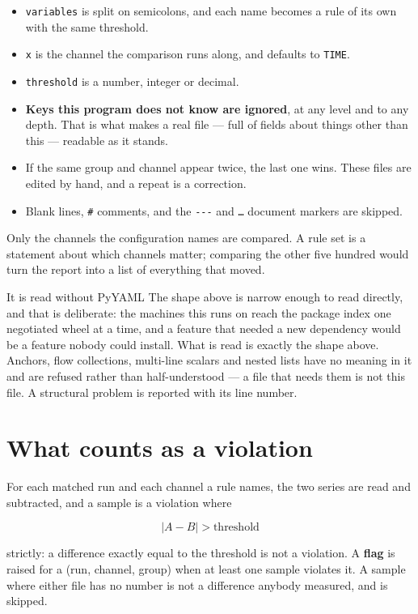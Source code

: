 \documentclass[11pt,a4paper,oneside]{report}
\newcommand{\code}[1]{\texttt{#1}}
\begin{document}
\begin{itemize}
\item \code{variables} is split on semicolons, and each name becomes a rule of
      its own with the same threshold.
\item \code{x} is the channel the comparison runs along, and defaults to
      \code{TIME}.
\item \code{threshold} is a number, integer or decimal.
\item \textbf{Keys this program does not know are ignored}, at any level and to
      any depth. That is what makes a real file --- full of fields about things
      other than this --- readable as it stands.
\item If the same group and channel appear twice, the last one wins. These
      files are edited by hand, and a repeat is a correction.
\item Blank lines, \code{\#} comments, and the \code{-{}-{}-} and \code{\ldots}
      document markers are skipped.
\end{itemize}

Only the channels the configuration names are compared. A rule set is a
statement about which channels matter; comparing the other five hundred would
turn the report into a list of everything that moved.

\begin{aoenote}{It is read without PyYAML}
The shape above is narrow enough to read directly, and that is deliberate: the
machines this runs on reach the package index one negotiated wheel at a time,
and a feature that needed a new dependency would be a feature nobody could
install. What is read is exactly the shape above. Anchors, flow collections,
multi-line scalars and nested lists have no meaning in it and are refused
rather than half-understood --- a file that needs them is not this file. A
structural problem is reported with its line number.
\end{aoenote}

\section{What counts as a violation}

For each matched run and each channel a rule names, the two series are read and
subtracted, and a sample is a violation where

\[ \lvert A - B \rvert > \text{threshold} \]

strictly: a difference exactly equal to the threshold is not a violation. A
\textbf{flag} is raised for a (run, channel, group) when at least one sample
violates it. A sample where either file has no number is not a difference
anybody measured, and is skipped.
\end{document}
